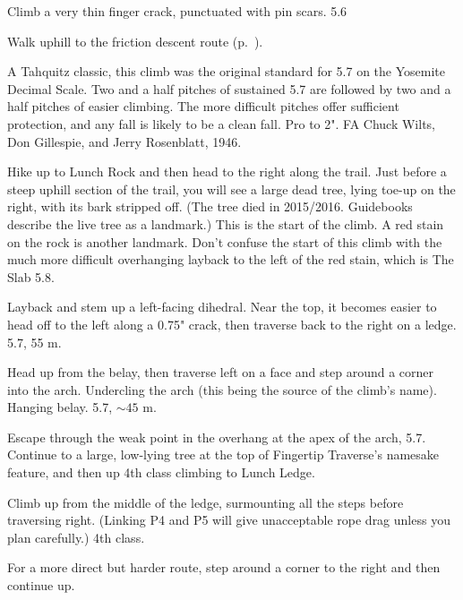 \documentclass{tahquitz}
\begin{document}
 Climb a very thin finger crack, punctuated with pin scars. 5.6

Walk uphill to the friction descent route  (p.~\pageref{subsec:friction-descent}).




A Tahquitz classic, this climb was the original standard for 5.7 on the Yosemite Decimal
Scale. Two and a half pitches of sustained 5.7 are followed by two and a half pitches
of easier climbing. The more difficult pitches offer sufficient protection, and any fall
is likely to be a clean fall. Pro to 2".
FA Chuck Wilts, Don Gillespie, and Jerry Rosenblatt, 1946.

Hike up to Lunch Rock and then head to the right along the
trail. Just before a steep uphill section of the trail, you
will see a large dead tree, lying toe-up on the right, with its
bark stripped off. (The tree died in 2015/2016.
Guidebooks describe the live tree as a landmark.) This
is the start of the climb. A red stain on the rock is another
landmark. Don't confuse the start of this climb with the much more
difficult overhanging layback to the left of the red stain,
which is The Slab 5.8.

 Layback and stem up a left-facing dihedral. Near the top, it becomes easier to
head off to the left along a 0.75" crack, then traverse back to the right
on a ledge. 5.7, 55 m.

 Head up from the belay, then traverse left on a face and
step around a corner into the arch. Undercling the arch (this being
the source of the climb's name). Hanging belay. 5.7, $\sim45$ m.

 Escape through the weak point in the overhang at the apex
of the arch, 5.7. Continue to a large, low-lying tree at the top of Fingertip Traverse's
namesake feature, and then up 4th class climbing to Lunch Ledge.


 Climb up from the middle of the ledge, surmounting all the steps
before traversing right. (Linking P4 and P5 will
give unacceptable rope drag unless you plan carefully.) 4th class.

 For a more direct but harder route, step around a corner
to the right and then continue up.
\end{document}
